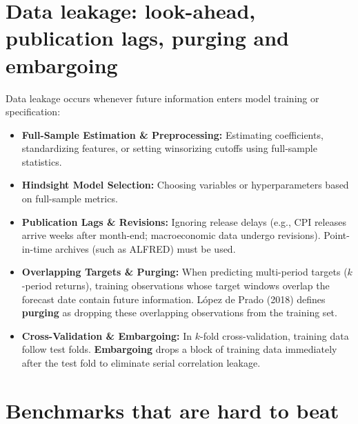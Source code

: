 \section{Data leakage: look-ahead, publication lags, purging and embargoing}
\label{sec:08-leakage}

Data leakage occurs whenever future information enters model training or specification:
\begin{itemize}
  \item \textbf{Full-Sample Estimation \& Preprocessing:} Estimating coefficients, standardizing features, or setting winsorizing cutoffs using full-sample statistics.
  \item \textbf{Hindsight Model Selection:} Choosing variables or hyperparameters based on full-sample metrics.
  \item \textbf{Publication Lags \& Revisions:} Ignoring release delays (e.g., CPI releases arrive weeks after month-end; macroeconomic data undergo revisions). Point-in-time archives (such as ALFRED) must be used.
  \item \textbf{Overlapping Targets \& Purging:} When predicting multi-period targets ($k$-period returns), training observations whose target windows overlap the forecast date contain future information. López de Prado (2018) defines \textbf{purging} as dropping these overlapping observations from the training set.
  \item \textbf{Cross-Validation \& Embargoing:} In $k$-fold cross-validation, training data follow test folds. \textbf{Embargoing} drops a block of training data immediately after the test fold to eliminate serial correlation leakage.
\end{itemize}

\section{Benchmarks that are hard to beat}
\label{sec:08-benchmarks}

